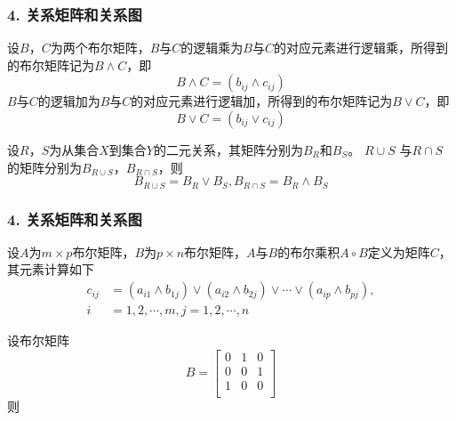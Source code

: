 \documentclass{beamer}
\begin{document}
\begin{CJK*}{UTF8}{gbsn}
\begin{frame}
  \frametitle{4. 关系矩阵和关系图}
  \begin{Def}
    设$B$，$C$为两个布尔矩阵，$B$与$C$的逻辑乘为$B$与$C$的对应元素进行逻辑乘，所得到的布尔矩阵记为$B \land C$，即
    \begin{equation*}
      B \land C = (b_{ij} \land c_{ij})
    \end{equation*}
    $B$与$C$的逻辑加为$B$与$C$的对应元素进行逻辑加，所得到的布尔矩阵记为$B \lor C$，即
    \begin{equation*}
      B \lor C = (b_{ij} \lor c_{ij})
    \end{equation*}
  \end{Def}
  \begin{Thm}
    设$R$，$S$为从集合$X$到集合$Y$的二元关系，其矩阵分别为$B_R$和$B_S$。 $R\cup S$ 与$R \cap S$的矩阵分别为$B_{R\cup S}$，$B_{R\cap S}$，则
    \begin{equation*}
      B_{R\cup S}=B_R \lor B_S, B_{R\cap S}=B_R \land B_S
    \end{equation*}
  \end{Thm}
\end{frame}

\begin{frame}
  \frametitle{4. 关系矩阵和关系图}
  \begin{Def}
    设$A$为$m\times p$布尔矩阵，$B$为$p \times n$布尔矩阵，$A$与$B$的布尔乘积$A \circ B$定义为矩阵$C$，其元素计算如下
    \begin{align*}
      c_{ij} &= (a_{i1}\land b_{1j}) \lor (a_{i2} \land b_{2j}) \lor \cdots \lor (a_{ip} \land b_{pj}), \\
      i &= 1,2,\cdots, m, j = 1,2,\cdots, n
    \end{align*}
  \end{Def}
  \pause
  设布尔矩阵
  \[B=\begin{bmatrix}
    0&1&0\\
    0&0&1\\
    1&0&0\\
  \end{bmatrix}
\]
\pause
则


\end{frame}
\end{CJK*}
\end{document}
